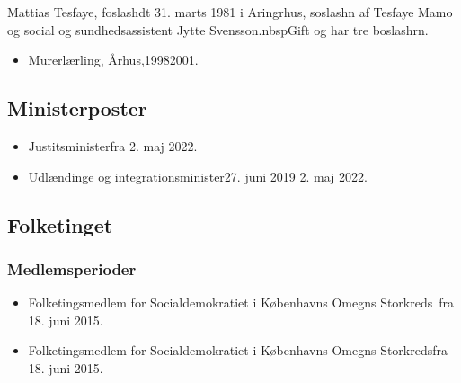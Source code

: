 \documentclass[11pt, a4paper]{awesome-cv}
\begin{document}
\makecvheader[R]
\makelettertitle
\begin{cvletter}
Mattias Tesfaye, foslashdt 31. marts 1981 i Aringrhus, soslashn af Tesfaye Mamo og social og sundhedsassistent Jytte Svensson.nbspGift og har tre boslashrn.

\begin{itemize}
\item Murerlærling, Århus,19982001.
\end{itemize}
\subsection*{Ministerposter}
\begin{itemize}
\item Justitsministerfra 2. maj 2022.
\item Udlændinge og integrationsminister27. juni 2019  2. maj 2022.
\end{itemize}
\subsection*{Folketinget}
\subsubsection*{Medlemsperioder}
\begin{itemize}
\item Folketingsmedlem for Socialdemokratiet i Københavns Omegns Storkreds fra 18. juni 2015.
\item Folketingsmedlem for Socialdemokratiet i Københavns Omegns Storkredsfra 18. juni 2015.
\end{itemize}

\end{cvletter}
\end{document}
